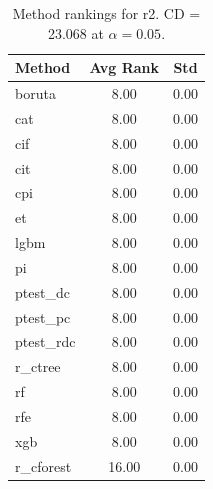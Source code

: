 \begin{table}[h]
\centering
\caption{Method rankings for r2. CD = 23.068 at $\alpha=0.05$.}
\label{tab:ranks_r2}
\begin{tabular}{lcc}
\toprule
Method & Avg Rank & Std \\
\midrule
boruta & 8.00 & 0.00 \\
cat & 8.00 & 0.00 \\
cif & 8.00 & 0.00 \\
cit & 8.00 & 0.00 \\
cpi & 8.00 & 0.00 \\
et & 8.00 & 0.00 \\
lgbm & 8.00 & 0.00 \\
pi & 8.00 & 0.00 \\
ptest_dc & 8.00 & 0.00 \\
ptest_pc & 8.00 & 0.00 \\
ptest_rdc & 8.00 & 0.00 \\
r_ctree & 8.00 & 0.00 \\
rf & 8.00 & 0.00 \\
rfe & 8.00 & 0.00 \\
xgb & 8.00 & 0.00 \\
r_cforest & 16.00 & 0.00 \\
\bottomrule
\end{tabular}
\end{table}